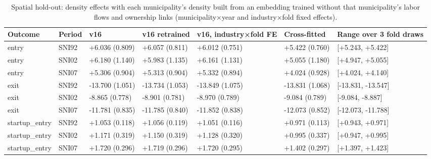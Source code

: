 \begin{table}
\caption{Spatial hold-out: density effects with each municipality's density built from an embedding trained without that municipality's labor flows and ownership links (municipality×year and industry×fold fixed effects).}
\label{tab:holdout_spatial_crossfit}
\begin{tabular}{lllllll}
\toprule
Outcome & Period & v16 & v16 retrained & v16, industry×fold FE & Cross-fitted & Range over 3 fold draws \\
\midrule
entry & SNI92 & +6.036 (0.809) & +6.057 (0.811) & +6.012 (0.751) & +5.422 (0.760) & [+5.243, +5.422] \\
entry & SNI02 & +6.180 (1.140) & +5.983 (1.135) & +6.161 (1.131) & +5.055 (1.180) & [+4.947, +5.055] \\
entry & SNI07 & +5.306 (0.904) & +5.313 (0.904) & +5.332 (0.894) & +4.024 (0.928) & [+4.024, +4.140] \\
exit & SNI92 & -13.700 (1.051) & -13.734 (1.053) & -13.849 (1.075) & -13.831 (1.068) & [-13.831, -13.547] \\
exit & SNI02 & -8.865 (0.778) & -8.901 (0.781) & -8.970 (0.789) & -9.084 (0.789) & [-9.084, -8.887] \\
exit & SNI07 & -11.781 (0.835) & -11.785 (0.840) & -11.852 (0.838) & -12.073 (0.852) & [-12.073, -11.788] \\
startup\_entry & SNI92 & +1.053 (0.118) & +1.056 (0.119) & +1.051 (0.116) & +0.971 (0.113) & [+0.943, +0.971] \\
startup\_entry & SNI02 & +1.171 (0.319) & +1.150 (0.319) & +1.128 (0.320) & +0.995 (0.337) & [+0.947, +0.995] \\
startup\_entry & SNI07 & +1.720 (0.296) & +1.719 (0.296) & +1.720 (0.295) & +1.402 (0.297) & [+1.397, +1.423] \\
\bottomrule
\end{tabular}
\end{table}
